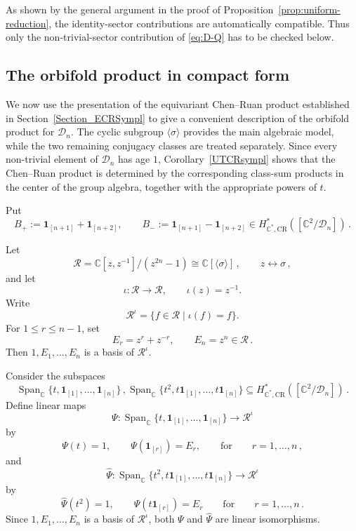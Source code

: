 \documentclass[a4paper,reqno]{amsart}
\theoremstyle{plain} %
\theoremstyle{definition} %
\theoremstyle{remark} %
\newcommand{\C}{\mathbb{C}}
\newcommand{\cD}{{\mathcal D}}
\newcommand{\cR}{{\mathcal R}}
\newcommand{\1}{\mathds{1}}   %
\begin{document}
As shown by the general argument in the proof of Proposition~\ref{prop:uniform-reduction}, 
the identity-sector contributions are automatically compatible. 
Thus only the non-trivial-sector contribution of \eqref{eq:D-Q}  has to be checked below.



\subsection{The orbifold product in compact form}

We now use the presentation of the equivariant Chen--Ruan product
established in Section~\ref{Section_ECRSympl} to give a convenient description of the
orbifold product for $\cD_n$. The cyclic subgroup $\langle\sigma\rangle$
provides the main algebraic model, while the two remaining conjugacy
classes are treated separately. Since every non-trivial element of
$\cD_n$ has age $1$, Corollary~\ref{UTCRsympl} shows that the Chen--Ruan product
is determined by the corresponding class-sum products in the center
of the group algebra, together with the appropriate powers of $t$.


Put
\begin{equation}\label{B+-}
B_+
:=
\mathbf1_{[n+1]}+\mathbf1_{[n+2]},
\qquad
B_-
:=
\mathbf1_{[n+1]}-\mathbf1_{[n+2]} \in H_{\mathbb C^*,\mathrm{CR}}^* ([\mathbb C^2/\cD_n]) \, .
\end{equation}

Let
\[
\mathcal R
=
\mathbb C[z,z^{-1}]/(z^{2n}-1) \cong \C[\langle \sigma \rangle] \, , \qquad z \longleftrightarrow \sigma \, ,
\]
and let
\[
\iota:\mathcal R\longrightarrow \mathcal R,
\qquad
\iota(z)=z^{-1}.
\]
Write
\[
\mathcal R^\iota
=
\{f\in \mathcal R\mid \iota(f)=f\}.
\]
For \(1\le r\le n-1\), set
\[
E_r=z^r+z^{-r},
\qquad
E_n=z^n \in \cR \, .
\]
Then $1,E_1,\ldots,E_n$ is a basis of \(\mathcal R^\iota\).

Consider the subspaces 
\[
\operatorname{Span}_{\mathbb C}\{t,\mathbf1_{[1]},\ldots,\mathbf1_{[n]}\} \, , 
\operatorname{Span}_{\mathbb C} \{t^2,t\mathbf1_{[1]},\ldots,t\mathbf1_{[n]}\} \subseteq  
H_{\mathbb C^*,\mathrm{CR}}^* ([\mathbb C^2/\cD_n]) \, .
\] 
Define linear maps
\[
\Psi:
\operatorname{Span}_{\mathbb C}
\{t,\mathbf1_{[1]},\ldots,\mathbf1_{[n]}\}
\longrightarrow
\mathcal R^\iota
\]
by
\[
\Psi(t)=1,
\qquad
\Psi(\mathbf1_{[r]})=E_r, \qquad \mbox{for} \qquad r=1, \ldots , n \, ,
\]
and
\[
\widehat\Psi:
\operatorname{Span}_{\mathbb C}
\{t^2,t\mathbf1_{[1]},\ldots,t\mathbf1_{[n]}\}
\longrightarrow
\mathcal R^\iota
\]
by
\[
\widehat\Psi(t^2)=1,
\qquad
\widehat\Psi(t\mathbf1_{[r]})=E_r \qquad \mbox{for} \qquad r=1, \ldots , n \, .
\]
Since \(1,E_1,\ldots,E_n\) is a basis of \(\mathcal R^\iota\), both
\(\Psi\) and \(\widehat\Psi\) are linear isomorphisms.
\end{document}
